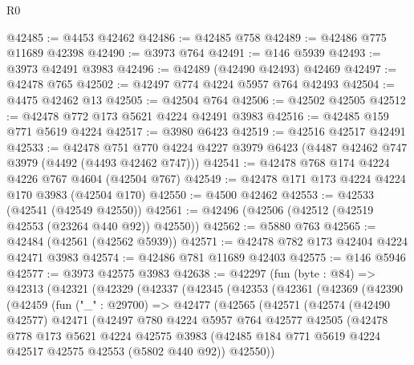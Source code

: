 \begin{lexlean}{R0}
\begin{coremodule}
@42485 := @4453 @42462
@42486 := @42485 @758
@42489 := @42486 @775 @11689 @42398
@42490 := @3973 @764
@42491 := @146 @5939
@42493 := @3973 @42491 @3983
@42496 := @42489 (@42490 @42493) @42469
@42497 := @42478 @765
@42502 := @42497 @774 @4224 @5957 @764 @42493
@42504 := @4475 @42462 @13
@42505 := @42504 @764
@42506 := @42502 @42505
@42512 := @42478 @772 @173 @5621 @4224 @42491 @3983
@42516 := @42485 @159 @771 @5619 @4224
@42517 := @3980 @6423
@42519 := @42516 @42517 @42491
@42533 := @42478
    @751
    @770
    @4224
    @4227
    @3979
    @6423
    (@4487 @42462 @747 @3979 (@4492 (@4493 @42462 @747)))
@42541 := @42478 @768 @174 @4224 @4226 @767 @4604 (@42504 @767)
@42549 := @42478 @171 @173 @4224 @4224 @170 @3983 (@42504 @170)
@42550 := @4500 @42462
@42553 := @42533 (@42541 (@42549 @42550))
@42561 := @42496 (@42506 (@42512 (@42519 @42553 (@23264 @440 @92)) @42550))
@42562 := @5880 @763
@42565 := @42484 (@42561 (@42562 @5939))
@42571 := @42478 @782 @173 @42404 @4224 @42471 @3983
@42574 := @42486 @781 @11689 @42403
@42575 := @146 @5946
@42577 := @3973 @42575 @3983
@42638 := @42297
    (fun (byte : @84) =>
    @42313
      (@42321
        (@42329
          (@42337
            (@42345
              (@42353
                (@42361
                  (@42369
                    (@42390
                      (@42459
                        (fun ("_" : @29700) =>
                        @42477
                          (@42565
                            (@42571
                              (@42574
                                (@42490 @42577)
                                @42471
                                (@42497
                                  @780
                                  @4224
                                  @5957
                                  @764
                                  @42577
                                  @42505
                                  (@42478
                                    @778
                                    @173
                                    @5621
                                    @4224
                                    @42575
                                    @3983
                                    (@42485
                                      @184
                                      @771
                                      @5619
                                      @4224
                                      @42517
                                      @42575
                                      @42553
                                      (@5802 @440 @92))
                                    @42550))

\end{coremodule}
\end{lexlean}
